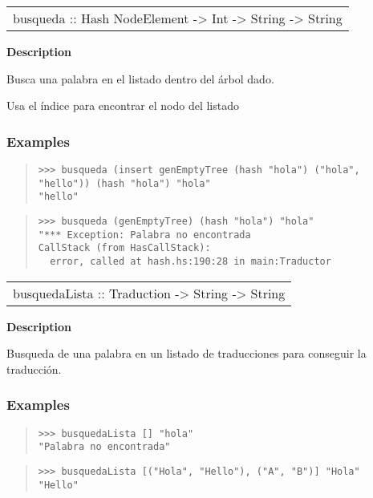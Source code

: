 \begin{haddockdesc}
\item[\begin{tabular}{@{}l}
busqueda :: Hash NodeElement -> Int -> String -> String
\end{tabular}]
{\haddockbegindoc
\textbf{Description}\par
Busca una palabra en el listado dentro del árbol dado.\par
Usa el índice para encontrar el nodo del listado\par
\subsubsection*{\textbf{Examples}}
\begin{quote}
{\haddockverb\begin{verbatim}
>>> busqueda (insert genEmptyTree (hash "hola") ("hola", "hello")) (hash "hola") "hola"
"hello"

\end{verbatim}}
\end{quote}
\begin{quote}
{\haddockverb\begin{verbatim}
>>> busqueda (genEmptyTree) (hash "hola") "hola"
"*** Exception: Palabra no encontrada
CallStack (from HasCallStack):
  error, called at hash.hs:190:28 in main:Traductor

\end{verbatim}}
\end{quote}}
\end{haddockdesc}
\begin{haddockdesc}
\item[\begin{tabular}{@{}l}
busquedaLista :: {\char 91}Traduction{\char 93} -> String -> String
\end{tabular}]
{\haddockbegindoc
\textbf{Description}\par
Busqueda de una palabra en un listado de traducciones para conseguir la traducción.\par
\subsubsection*{\textbf{Examples}}
\begin{quote}
{\haddockverb\begin{verbatim}
>>> busquedaLista [] "hola"
"Palabra no encontrada"

\end{verbatim}}
\end{quote}
\begin{quote}
{\haddockverb\begin{verbatim}
>>> busquedaLista [("Hola", "Hello"), ("A", "B")] "Hola"
"Hello"

\end{verbatim}}
\end{quote}}
\end{haddockdesc}
